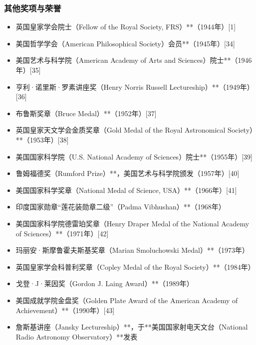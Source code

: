 \subsubsection{其他奖项与荣誉}
\begin{itemize}
\item 英国皇家学会院士（Fellow of the Royal Society, FRS）**（1944年）[1]
\item 美国哲学学会（American Philosophical Society）会员**（1945年）[34]
\item 美国艺术与科学院（American Academy of Arts and Sciences）院士**（1946年）[35]
\item 亨利·诺里斯·罗素讲座奖（Henry Norris Russell Lectureship）**（1949年）[36]
\item 布鲁斯奖章（Bruce Medal）**（1952年）[37]
\item 英国皇家天文学会金质奖章（Gold Medal of the Royal Astronomical Society）**（1953年）[38]
\item 美国国家科学院（U.S. National Academy of Sciences）院士**（1955年）[39]
\item 鲁姆福德奖（Rumford Prize）**，美国艺术与科学院颁发（1957年）[40]
\item 美国国家科学奖章（National Medal of Science, USA）**（1966年）[41]
\item 印度国家勋章“莲花装勋章二级”（Padma Vibhushan）**（1968年）
\item 美国国家科学院德雷珀奖章（Henry Draper Medal of the National Academy of Sciences）**（1971年）[42]
\item 玛丽安·斯摩鲁霍夫斯基奖章（Marian Smoluchowski Medal）**（1973年）
\item 英国皇家学会科普利奖章（Copley Medal of the Royal Society）**（1984年）
\item 戈登·J·莱因奖（Gordon J. Laing Award）**（1989年）
\item 美国成就学院金盘奖（Golden Plate Award of the American Academy of Achievement）**（1990年）[43]
\item 詹斯基讲座（Jansky Lectureship）**，于**美国国家射电天文台（National Radio Astronomy Observatory）**发表
\end{itemize}

